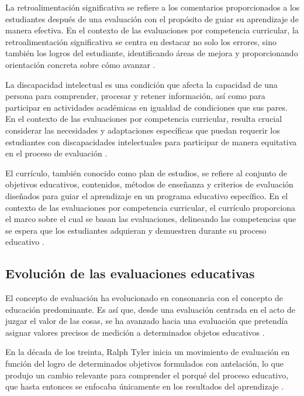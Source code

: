 La retroalimentación significativa se refiere a los comentarios proporcionados a los estudiantes después de una evaluación con el propósito de guiar su aprendizaje de manera efectiva. En el contexto de las evaluaciones por competencia curricular, la retroalimentación significativa se centra en destacar no solo los errores, sino también los logros del estudiante, identificando áreas de mejora y proporcionando orientación concreta sobre cómo avanzar \cite{ref27_blackwiliam}.

La discapacidad intelectual es una condición que afecta la capacidad de una persona para comprender, procesar y retener información, así como para participar en actividades académicas en igualdad de condiciones que sus pares. En el contexto de las evaluaciones por competencia curricular, resulta crucial considerar las necesidades y adaptaciones específicas que puedan requerir los estudiantes con discapacidades intelectuales para participar de manera equitativa en el proceso de evaluación \cite{ref28_aamr}.

El currículo, también conocido como plan de estudios, se refiere al conjunto de objetivos educativos, contenidos, métodos de enseñanza y criterios de evaluación diseñados para guiar el aprendizaje en un programa educativo específico. En el contexto de las evaluaciones por competencia curricular, el currículo proporciona el marco sobre el cual se basan las evaluaciones, delineando las competencias que se espera que los estudiantes adquieran y demuestren durante su proceso educativo \cite{ref29_curriculo_ec}.

\subsection{Evolución de las evaluaciones educativas}

El concepto de evaluación ha evolucionado en consonancia con el concepto de educación predominante. Es así que, desde una evaluación centrada en el acto de juzgar el valor de las cosas, se ha avanzado hacia una evaluación que pretendía asignar valores precisos de medición a determinados objetos educativos \cite{ref30_stufflebeam}.

En la década de los treinta, Ralph Tyler inicia un movimiento de evaluación en función del logro de determinados objetivos formulados con antelación, lo que produjo un cambio relevante para comprender el porqué del proceso educativo, que hasta entonces se enfocaba únicamente en los resultados del aprendizaje \cite{ref31_tyler}.

